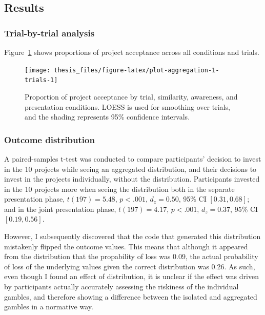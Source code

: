 \documentclass[a4paper, nobind, dvipsnames]{templates/ociamthesis}
\theoremstyle{definition}
\theoremstyle{definition}
\theoremstyle{definition}
\theoremstyle{definition}
\theoremstyle{remark}
\begin{document}
\hypertarget{results-aggregation-1-appendix}{%
\subsection{Results}\label{results-aggregation-1-appendix}}

\hypertarget{trial-by-trial-aggregation-1}{%
\subsubsection{Trial-by-trial analysis}\label{trial-by-trial-aggregation-1}}

Figure~\ref{fig:plot-aggregation-1-trials} shows proportions of project
acceptance across all conditions and trials.



\begin{figure}
\texttt{[image: thesis\_files/figure-latex/plot-aggregation-1-trials-1]} \caption{Proportion of project acceptance by trial, similarity, awareness, and presentation conditions. LOESS is used for smoothing over trials, and the shading represents 95\% confidence intervals.}\label{fig:plot-aggregation-1-trials}
\end{figure}

\hypertarget{outcome-distribution-aggregation-1}{%
\subsubsection{Outcome distribution}\label{outcome-distribution-aggregation-1}}

A paired-samples t-test was conducted to compare participants' decision to
invest in the 10 projects while seeing an aggregated distribution, and their
decisions to invest in the projects individually, without the distribution.
Participants invested in the 10 projects more when seeing the distribution both
in the separate presentation phase,
\(t(197) = 5.48\), \(p < .001\), \(d_z = 0.50\), 95\% CI \([0.31, 0.68]\); and in the joint
presentation phase, \(t(197) = 4.17\), \(p < .001\), \(d_z = 0.37\), 95\% CI \([0.19, 0.56]\).

However, I subsequently discovered that the code that generated this
distribution mistakenly flipped the outcome values. This means that although it
appeared from the distribution that the propability of loss was
0.09, the actual probability of loss of the
underlying values given the correct distribution was
0.26. As such, even though I found an
effect of distribution, it is unclear if the effect was driven by participants
actually accurately assessing the riskiness of the individual gambles, and
therefore showing a difference between the isolated and aggregated gambles in a
normative way.
\end{document}
